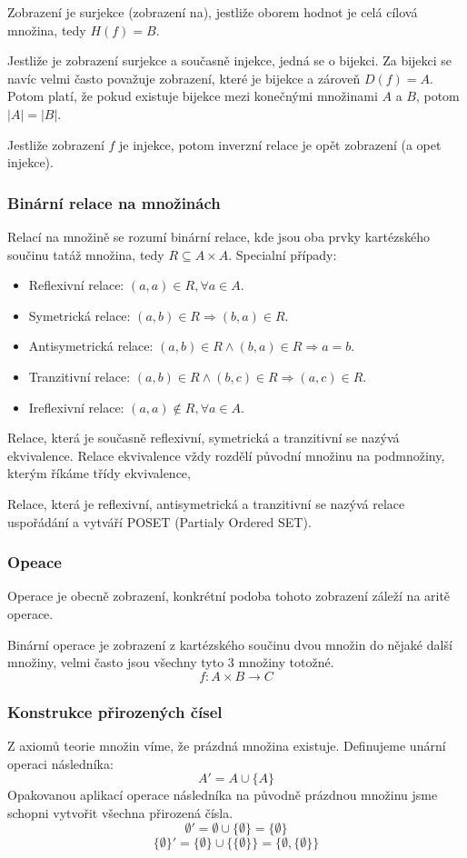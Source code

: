 Zobrazení je surjekce (zobrazení na), jestliže oborem hodnot je celá cílová množina, tedy $H(f) = B$.

Jestliže je zobrazení surjekce a současně injekce, jedná se o bijekci. Za bijekci se navíc velmi
často považuje zobrazení, které je bijekce a zároveň $D(f) = A$.
Potom platí, že pokud existuje bijekce mezi konečnými množinami $A$ a $B$, potom $|A| = |B|$.

Jestliže zobrazení $f$ je injekce, potom inverzní relace je opět zobrazení (a opet injekce).

\subsubsection*{Binární relace na množinách}
Relací na množině se rozumí binární relace, kde jsou oba prvky kartézského součinu tatáž
množina, tedy $R \subseteq A \times A$.
Specialní případy:
\begin{itemize}
	\item Reflexivní relace: $(a, a) \in R, \forall a \in A$.
	\item Symetrická relace: $(a, b) \in R \Rightarrow (b, a) \in R$.
	\item Antisymetrická relace: $(a, b) \in R \wedge (b, a) \in R \Rightarrow a = b$.
	\item Tranzitivní relace: $(a, b) \in R \wedge (b, c) \in R \Rightarrow (a, c) \in R$.
	\item Ireflexivní relace: $(a, a) \notin R, \forall a \in A$.
\end{itemize}
Relace, která je současně reflexivní, symetrická a tranzitivní se nazývá ekvivalence.
Relace ekvivalence vždy rozdělí původní množinu na podmnožiny, kterým říkáme třídy ekvivalence,

Relace, která je reflexivní, antisymetrická a tranzitivní se nazývá relace uspořádání a vytváří
POSET (Partialy Ordered SET).

\subsubsection*{Opeace}
Operace je obecně zobrazení, konkrétní podoba tohoto zobrazení záleží na aritě operace.

Binární operace je zobrazení z kartézského součinu dvou množin do nějaké další množiny, velmi často
jsou všechny tyto 3 množiny totožné.
$$f: A \times B \rightarrow C$$

\subsubsection*{Konstrukce přirozených čísel}
Z axiomů teorie množin víme, že prázdná množina existuje. Definujeme unární operaci
následníka:
$$A' = A \cup \{A\}$$
Opakovanou aplikací operace následníka na původně prázdnou množinu jsme schopni vytvořit
všechna přirozená čísla.
$$\emptyset' = \emptyset \cup \{\emptyset\} = \{\emptyset\}$$
$$\{\emptyset\}' = \{\emptyset\} \cup \{\{\emptyset\}\} = \{\emptyset, \{\emptyset\}\}$$

